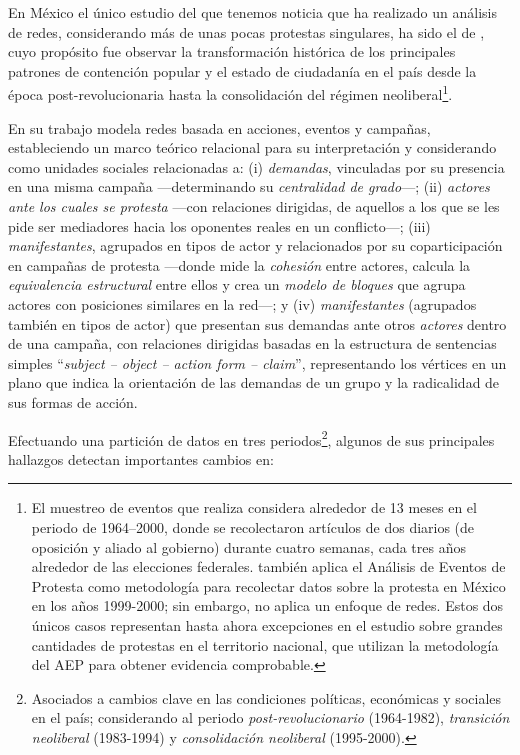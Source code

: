 \documentclass[letterpaper, 11pt]{book}
\theoremstyle{definition}
\theoremstyle{remark}
\begin{document}
En México el único estudio del que tenemos noticia que ha realizado un análisis de redes, considerando más de unas pocas protestas singulares, ha sido el de \citet{2003_Wada_Tesis}, cuyo propósito fue observar la transformación histórica de los principales patrones de contención popular y el estado de ciudadanía en el país desde la época post-revolucionaria hasta la consolidación del régimen neoliberal\footnote{
    El muestreo de eventos que realiza considera alrededor de 13 meses en el periodo de 1964--2000, donde se recolectaron artículos de dos diarios (de oposición y aliado al gobierno) durante cuatro semanas, cada tres años alrededor de las elecciones federales. 
    \citet{2005_Strawn_Tesis} también aplica el Análisis de Eventos de Protesta como metodología para recolectar datos sobre la protesta en México en los años 1999-2000; sin embargo, no aplica un enfoque de redes. 
    Estos dos únicos casos representan hasta ahora excepciones en el estudio sobre grandes cantidades de protestas en el territorio nacional, que utilizan la metodología del AEP para obtener evidencia comprobable. 
}. 

En su trabajo modela redes basada en acciones, eventos y campañas, estableciendo un marco teórico relacional para su interpretación y considerando como unidades sociales relacionadas a: 
(i) \emph{demandas}, vinculadas por su presencia en una misma campaña ---determinando su \emph{centralidad de grado}---; 
(ii) \emph{actores ante los cuales se protesta} ---con relaciones dirigidas, de aquellos a los que se les pide ser mediadores hacia los oponentes reales en un conflicto---; 
(iii) \emph{manifestantes}, agrupados en tipos de actor y relacionados por su coparticipación en campañas de protesta ---donde mide la \emph{cohesión} entre actores, calcula la \emph{equivalencia estructural} entre ellos y crea un \emph{modelo de bloques} que agrupa actores con posiciones similares en la red---; 
y (iv) \emph{manifestantes} (agrupados también en tipos de actor) que presentan sus demandas ante otros \emph{actores} dentro de una campaña, con relaciones dirigidas basadas en la estructura de sentencias simples ``\emph{subject -- object -- action form -- claim}'', representando los vértices en un plano que indica la orientación de las demandas de un grupo y la radicalidad de sus formas de acción.

Efectuando una partición de datos en tres periodos\footnote{
    Asociados a cambios clave en las condiciones políticas, económicas y sociales en el país; considerando al periodo \emph{post-revolucionario} (1964-1982),  \emph{transición neoliberal} (1983-1994) y \emph{consolidación neoliberal} (1995-2000).
}, 
algunos de sus principales hallazgos detectan importantes cambios en:
\end{document}
